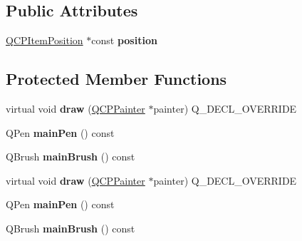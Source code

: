 \subsection*{Public Attributes}
\begin{DoxyCompactItemize}
\item 
\hyperlink{class_q_c_p_item_position}{Q\+C\+P\+Item\+Position} $\ast$const {\bfseries position}\hypertarget{class_q_c_p_item_tracer_ae65d3a6666f0bfde26a9d3239de6821b}{}\label{class_q_c_p_item_tracer_ae65d3a6666f0bfde26a9d3239de6821b}

\end{DoxyCompactItemize}
\subsection*{Protected Member Functions}
\begin{DoxyCompactItemize}
\item 
virtual void {\bfseries draw} (\hyperlink{class_q_c_p_painter}{Q\+C\+P\+Painter} $\ast$painter) Q\+\_\+\+D\+E\+C\+L\+\_\+\+O\+V\+E\+R\+R\+I\+DE\hypertarget{class_q_c_p_item_tracer_a11f187ffea436434f3b5cfc387811967}{}\label{class_q_c_p_item_tracer_a11f187ffea436434f3b5cfc387811967}

\item 
Q\+Pen {\bfseries main\+Pen} () const \hypertarget{class_q_c_p_item_tracer_af87132b7698d5bb35c96a8a0b9e7180e}{}\label{class_q_c_p_item_tracer_af87132b7698d5bb35c96a8a0b9e7180e}

\item 
Q\+Brush {\bfseries main\+Brush} () const \hypertarget{class_q_c_p_item_tracer_aaf4e72e2d87f53279b9f9ba624961bf5}{}\label{class_q_c_p_item_tracer_aaf4e72e2d87f53279b9f9ba624961bf5}

\item 
virtual void {\bfseries draw} (\hyperlink{class_q_c_p_painter}{Q\+C\+P\+Painter} $\ast$painter) Q\+\_\+\+D\+E\+C\+L\+\_\+\+O\+V\+E\+R\+R\+I\+DE\hypertarget{class_q_c_p_item_tracer_aad802fc9727825e4e96acaf4ec408b1e}{}\label{class_q_c_p_item_tracer_aad802fc9727825e4e96acaf4ec408b1e}

\item 
Q\+Pen {\bfseries main\+Pen} () const \hypertarget{class_q_c_p_item_tracer_af87132b7698d5bb35c96a8a0b9e7180e}{}\label{class_q_c_p_item_tracer_af87132b7698d5bb35c96a8a0b9e7180e}

\item 
Q\+Brush {\bfseries main\+Brush} () const \hypertarget{class_q_c_p_item_tracer_aaf4e72e2d87f53279b9f9ba624961bf5}{}\label{class_q_c_p_item_tracer_aaf4e72e2d87f53279b9f9ba624961bf5}

\end{DoxyCompactItemize}
